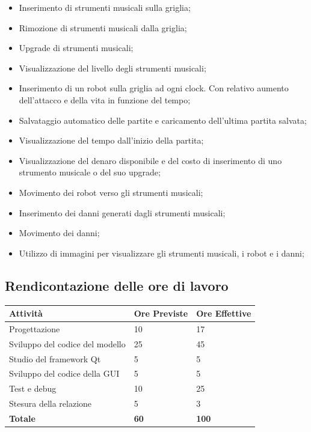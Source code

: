 \documentclass[11pt]{article}
\begin{document}
\begin{itemize}
	\item Inserimento di strumenti musicali sulla griglia;

	\item Rimozione di strumenti musicali dalla griglia;

	\item Upgrade di strumenti musicali;

	\item Visualizzazione del livello degli strumenti musicali;

	\item Inserimento di un robot sulla griglia ad ogni clock. Con relativo
		aumento dell'attacco e della vita in funzione del tempo;

	\item Salvataggio automatico delle partite e caricamento dell'ultima
		partita salvata;

	\item Visualizzazione del tempo dall'inizio della partita;

	\item Visualizzazione del denaro disponibile e del costo di inserimento di
		uno strumento musicale o del suo upgrade;

	\item Movimento dei robot verso gli strumenti musicali;

	\item Inserimento dei danni generati dagli strumenti musicali; 
	
	\item Movimento dei danni;

	\item Utilizzo di immagini per visualizzare gli strumenti musicali, i robot
		e i danni;
\end{itemize}

\subsection{Rendicontazione delle ore di lavoro}

\begin{table}[H]
	\centering
	\begin{tabular}{|l|l|l|}
		\hline
		\textbf{Attività} & \textbf{Ore Previste} & \textbf{Ore Effettive} \\
		\hline
		Progettazione & 10 & 17 \\
		\hline
		Sviluppo del codice del modello & 25 & 45 \\
		\hline
		Studio del framework Qt & 5 & 5 \\
		\hline
		Sviluppo del codice della GUI & 5 & 5 \\
		\hline
		Test e debug & 10 & 25 \\
		\hline
		Stesura della relazione & 5 & 3 \\
		\hline
		\textbf{Totale} & \textbf{60} & \textbf{100} \\
		\hline
	\end{tabular}
\end{table}
\end{document}
